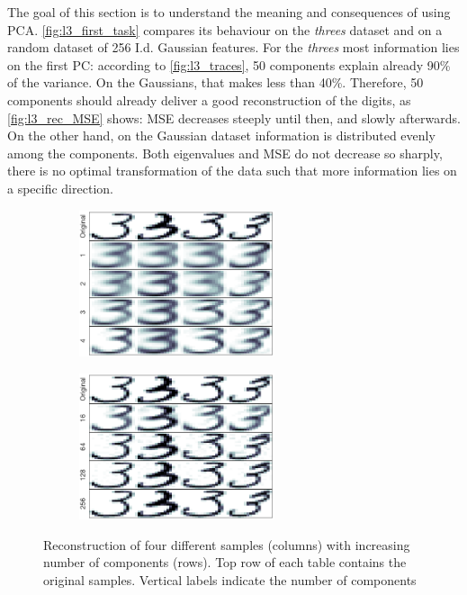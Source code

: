 \documentclass[a4paper, 10pt]{article}
\begin{document}
  The goal of this section is to understand the meaning and consequences of using
  PCA. \autoref{fig:l3_first_task} compares its behaviour on the \emph{threes} 
  dataset and on a random dataset of 256 I.d. Gaussian features. For the 
  \emph{threes} most information lies on the first PC: according to
  \autoref{fig:l3_traces}, 50 components explain already 90\% of the variance. On
  the Gaussians, that makes less than 40\%. Therefore, 50 components 
  should already deliver a good reconstruction of the digits, as 
  \autoref{fig:l3_rec_MSE} shows: MSE decreases steeply until then, and slowly 
  afterwards. On the other hand, on the Gaussian dataset information is 
  distributed evenly among the components. Both eigenvalues and MSE do not 
  decrease so sharply, there is no optimal transformation of the data such 
  that more information lies on a specific direction. 

  \begin{figure}[h]
    \centering
    \hfill
    \begin{subfigure}[t]{0.4\linewidth}
      \includegraphics[width=\linewidth, height=4.3cm]{./lab3/PCA/mosaics/PC_1_4_small.png}
      \label{fig:few_pc}
    \end{subfigure}
    \hfill
    \begin{subfigure}[t]{0.4\linewidth}
      \includegraphics[width=\linewidth,height=4.3cm]{./lab3/PCA/mosaics/PC_16_256_small.png}
      \label{fig:many_pc}
    \end{subfigure}
    \hfill \mbox{}
    \caption{Reconstruction of four different samples (columns) with increasing
      number of components (rows). Top row of each table contains the 
    original samples. Vertical labels indicate the number of components}
    \label{fig:l3_threes_pc}
  \end{figure}
\end{document}
